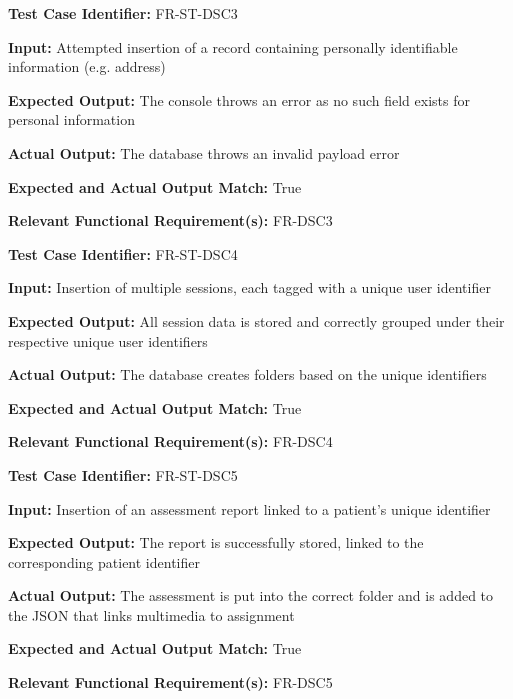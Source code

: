 \documentclass[12pt, titlepage]{article}
\begin{document}
\begin{mdframed}[linewidth=0.5mm] \par
  \textbf{Test Case Identifier:} FR-ST-DSC3 \par
  \textbf{Input:} Attempted insertion of a record containing personally identifiable information (e.g. address) \par
  \textbf{Expected Output:} The console throws an error as no such field exists for personal information \par
  \textbf{Actual Output:} The database throws an invalid payload error\par
  \textbf{Expected and Actual Output Match:} True \par
  \textbf{Relevant Functional Requirement(s):} FR-DSC3
\end{mdframed}

\begin{mdframed}[linewidth=0.5mm] \par
  \textbf{Test Case Identifier:} FR-ST-DSC4 \par
  \textbf{Input:} Insertion of multiple sessions, each tagged with a unique user identifier \par
  \textbf{Expected Output:} All session data is stored and correctly grouped under their respective unique user identifiers \par
  \textbf{Actual Output:} The database creates folders based on the unique identifiers \par
  \textbf{Expected and Actual Output Match:} True \par
  \textbf{Relevant Functional Requirement(s):} FR-DSC4
\end{mdframed}

\begin{mdframed}[linewidth=0.5mm] \par
  \textbf{Test Case Identifier:} FR-ST-DSC5 \par
  \textbf{Input:} Insertion of an assessment report linked to a patient's unique identifier \par
  \textbf{Expected Output:} The report is successfully stored, linked to the corresponding patient identifier\par
  \textbf{Actual Output:} The assessment is put into the correct folder and is added to the JSON that links multimedia to assignment \par
  \textbf{Expected and Actual Output Match:} True \par
  \textbf{Relevant Functional Requirement(s):} FR-DSC5
\end{mdframed}
\end{document}
